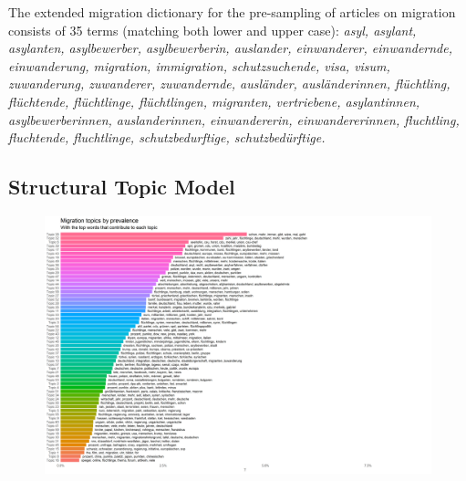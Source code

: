 \documentclass{article}
\begin{document}
The extended migration dictionary for the pre-sampling of articles on migration consists of 35 terms (matching both lower and upper case): \textit{asyl, asylant, asylanten, asylbewerber, asylbewerberin, auslander, einwanderer, einwandernde, einwanderung, migration, immigration, schutzsuchende, visa, visum, zuwanderung, zuwanderer, zuwandernde, ausländer, ausländerinnen, flüchtling, flüchtende, flüchtlinge, flüchtlingen, migranten, vertriebene, asylantinnen, asylbewerberinnen, auslanderinnen, einwandererin, einwandererinnen, fluchtling, fluchtende, fluchtlinge, schutzbedurftige, schutzbedürftige.}


\subsection{Structural Topic Model}\label{app:stm}

\begin{figure}[!ht]
    \centering
    \includegraphics[width=2\textwidth]{paper/vis/mig_topics_plot.png}
    \label{fig:did_corr}
\end{figure}
\end{document}
